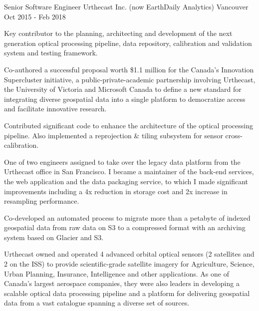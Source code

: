 \begin{cventries}
\cventrywithsummary
{Senior Software Engineer} %
{Urthecast Inc. (now EarthDaily Analytics)} %
{Vancouver} %
{Oct 2015 - Feb 2018} %
{
  \begin{cvitems} %
    \item {Key contributor to the planning, architecting and development of the next generation optical processing pipeline, data repository, calibration and validation system and testing framework.}
    \item {Co-authored a successful proposal worth \$1.1 million for the Canada's Innovation Supercluster initiative, a public-private-academic partnership involving Urthecast, the University of Victoria and Microsoft Canada to define a new standard for integrating diverse geospatial data into a single platform to democratize access and facilitate innovative research.}
    \item {Contributed significant code to enhance the architecture of the optical processing pipeline. Also implemented a reprojection \& tiling subsystem for sensor cross-calibration.}
    \item {One of two engineers assigned to take over the legacy data platform from the Urthecast office in San Francisco. I became a maintainer of the back-end services, the web application and the data packaging service, to which I made significant improvements including a 4x reduction in storage cost and 2x increase in resampling performance.}
    \item {Co-developed an automated process to migrate more than a petabyte of indexed geospatial data from raw data on S3 to a compressed format with an archiving system based on Glacier and S3.}
  \end{cvitems}
}
{
  Urthecast owned and operated 4 advanced orbital optical sensors (2 satellites and 2 on the ISS) to provide scientific-grade satellite imagery for Agriculture, Science, Urban Planning, Insurance, Intelligence and other applications. As one of Canada's largest aerospace companies, they were also leaders in developing a scalable optical data processing pipeline and a platform for delivering geospatial data from a vast catalogue spanning a diverse set of sources.
}


\end{cventries}

